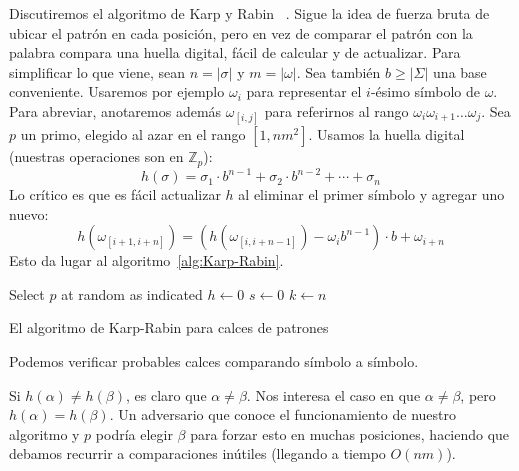   Discutiremos el algoritmo de Karp y Rabin~%
    \cite{karp87:_efficient_random_pattern_match_algor}.
  Sigue la idea de fuerza bruta de ubicar el patrón en cada posición,
  pero en vez de comparar el patrón con la palabra compara una huella digital,
  fácil de calcular y de actualizar.
  Para simplificar lo que viene,
  sean \(n = \lvert \sigma \rvert\)
  y \(m = \lvert \omega \rvert\).
  Sea también \(b \ge \lvert \Sigma \rvert\) una base conveniente.
  Usaremos por ejemplo \(\omega_i\)
  para representar el \(i\)\nobreakdash-ésimo símbolo de \(\omega\).
  Para abreviar,
  anotaremos además \(\omega_{[i, j]}\)
  para referirnos al rango \(\omega_i \omega_{i + 1} \dots \omega_j\).
  Sea \(p\) un primo,
  elegido al azar en el rango \([1, n m^2]\).
  Usamos la huella digital
  (nuestras operaciones son en \(\mathbb{Z}_p\)):
  \begin{equation*}
    h(\sigma)
      = \sigma_1 \cdot b^{n - 1}
          + \sigma_2 \cdot b^{n - 2}
          + \dotsb
          + \sigma_n
  \end{equation*}
  Lo crítico
  es que es fácil actualizar \(h\) al eliminar el primer símbolo
  y agregar uno nuevo:
  \begin{equation*}
    h(\omega_{[i + 1, i + n]})
      = (h(\omega_{[i , i + n - 1]}) - \omega_i b^{n - 1})
           \cdot b + \omega_{i + n}
  \end{equation*}
  Esto da lugar al algoritmo~\ref{alg:Karp-Rabin}.
  \begin{algorithm}[ht]
    \DontPrintSemicolon\Indp

    Select \(p\) at random as indicated \;
    \BlankLine
    \(h \gets 0\) \;
    \BlankLine
    \(s \gets 0\) \;
    \BlankLine
    \(k \gets n\) \;
    \caption{El algoritmo de Karp-Rabin para calces de patrones}
    \label{alg:Karp-Rabin}
  \end{algorithm}
  Podemos verificar probables calces comparando símbolo a símbolo.

  Si \(h(\alpha) \ne h(\beta)\),
  es claro que \(\alpha \ne \beta\).
  Nos interesa el caso en que \(\alpha \ne \beta\),
  pero \(h(\alpha) = h(\beta)\).
  Un adversario que conoce el funcionamiento de nuestro algoritmo y \(p\)
  podría elegir \(\beta\) para forzar esto en muchas posiciones,
  haciendo que debamos recurrir a comparaciones inútiles
  (llegando a tiempo \(O(n m)\)).

